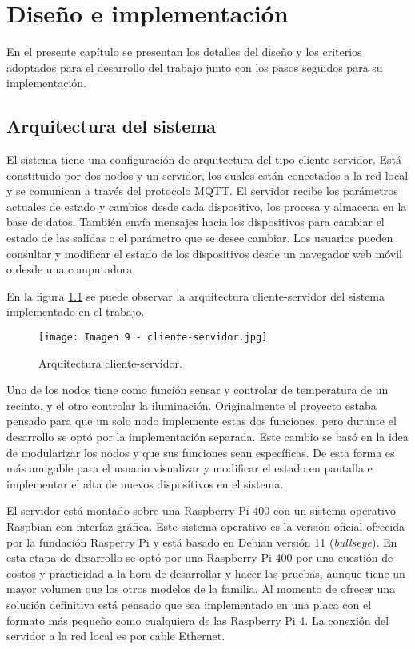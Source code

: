 \chapter{Diseño e implementación}

\label{Chapter3}

En el presente capítulo se presentan los detalles del diseño y los criterios adoptados para el desarrollo del trabajo junto con los pasos seguidos para su implementación.

\section{Arquitectura del sistema}

El sistema tiene una configuración de arquitectura del tipo cliente-servidor. Está constituido por dos nodos y un servidor, los cuales están conectados a la red local y se comunican a través del protocolo MQTT. El servidor recibe los parámetros actuales de estado y cambios desde cada dispositivo, los procesa y almacena en la base de datos. También envía mensajes hacia los dispositivos para cambiar el estado de las salidas o el parámetro que se desee cambiar. Los usuarios pueden consultar y modificar el estado de los dispositivos desde un navegador web móvil o desde una computadora.

En la figura \ref{fig:9} se puede observar la arquitectura cliente-servidor del sistema implementado en el trabajo.

\begin{figure}[h]
\centering
\texttt{[image: Imagen 9 - cliente-servidor.jpg]}
\caption[Arquitectura cliente-servidor]{Arquitectura cliente-servidor. \footnotemark}
\label{fig:9}
\end{figure}

Uno de los nodos tiene como función sensar y controlar de temperatura de un recinto, y el otro controlar la iluminación. Originalmente el proyecto estaba pensado para que un solo nodo implemente estas dos funciones, pero durante el desarrollo se optó por la implementación separada. Este cambio se basó en la idea de modularizar los nodos y que sus funciones sean específicas. De esta forma es más amigable para el usuario visualizar y modificar el estado en pantalla e implementar el alta de nuevos dispositivos en el sistema.

El servidor está montado sobre una Raspberry Pi 400 con un sistema operativo Raspbian con interfaz gráfica. Este sistema operativo es la versión oficial ofrecida por la fundación Rasperry Pi y está basado en Debian versión 11 (\textit{bullseye}). En esta etapa de desarrollo se optó por una Raspberry Pi 400 por una cuestión de costos y practicidad a la hora de desarrollar y hacer las pruebas, aunque tiene un mayor volumen que los otros modelos de la familia. Al momento de ofrecer una solución definitiva está pensado que sea implementado en una placa con el formato más pequeño como cualquiera de las Raspberry Pi 4. La conexión del servidor a la red local es por cable Ethernet.

